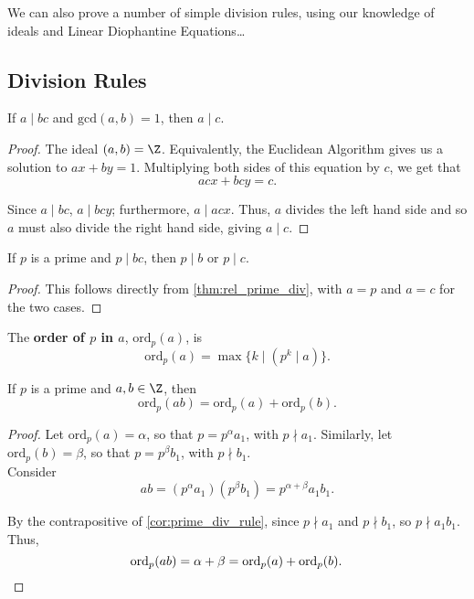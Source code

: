 \documentclass[11pt]{article}
\begin{document}
We can also prove a number of simple division rules, using our knowledge of ideals and Linear Diophantine Equations\dots

\subsection{Division Rules}
\begin{theorem}\label{thm:rel_prime_div}
If $a \mid bc$ and $\mathrm{gcd}(a, b) = 1$, then $a \mid c$.     
\end{theorem}

\begin{proof}
The ideal $(a, b) = \Z$. Equivalently, the Euclidean Algorithm gives us a solution to $ax + by = 1$. Multiplying both sides of this equation by $c$,
we get that
\[
    acx + bcy = c.
\]

Since $a \mid bc$, $a \mid bcy$; furthermore, $a \mid acx$. Thus, $a$ divides the left hand side and so $a$ must also divide the right hand side, giving $a \mid c$.
\end{proof}

\begin{corollary}\label{cor:prime_div_rule}
If $p$ is a prime and $p \mid bc$, then $p \mid b$ or $p \mid c$.
\end{corollary}

\begin{proof}
This follows directly from \cref{thm:rel_prime_div}, with $a = p$ and $a = c$ for the two cases.
\end{proof}

\begin{definition}[Order]
The \textbf{order of $p$ in $a$}, $\mathrm{ord}_p(a)$, is
\[
    \mathrm{ord}_p(a) = \max \{ k \mid (p^k \mid a) \}.
\] 
\end{definition}

\begin{corollary}
If $p$ is a prime and $a, b \in \Z$, then 
\[
    \mathrm{ord}_p(ab) = \mathrm{ord}_p(a) + \mathrm{ord}_p(b).   
\]    
\end{corollary}

\begin{proof}
Let $\mathrm{ord}_p(a) = \alpha$, so that $p = p^\alpha a_1$, with $p \nmid a_1$. 
Similarly, let $\mathrm{ord}_p(b) = \beta$, so that $p = p^\beta b_1$, with $p \nmid b_1$. \\

Consider 
\[
    ab = \left(p^\alpha a_1\right) \left( p^\beta b_1 \right)  = p^{\alpha + \beta} a_1b_1.
\]

By the contrapositive of \cref{cor:prime_div_rule}, since $p \nmid a_1$ and $p \nmid b_1$, so $p \nmid a_1b_1$. Thus, 
\[
    \mathrm{ord}_p(ab) = \alpha + \beta = \mathrm{ord}_p(a) + \mathrm{ord}_p(b). \, \qedhere
\]
\end{proof}
\end{document}
